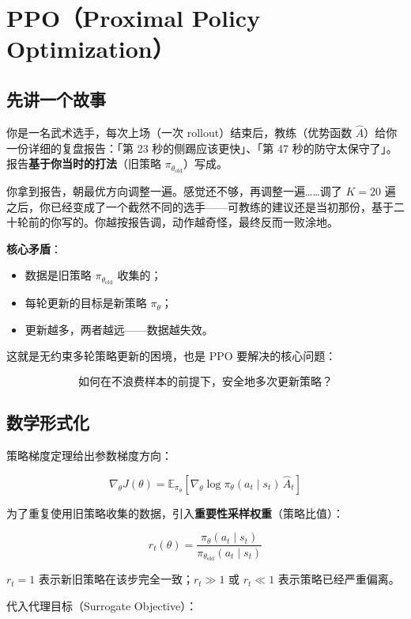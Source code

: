 \documentclass{article}
\begin{document}
\section*{PPO（Proximal Policy Optimization）}

\subsection*{先讲一个故事}

你是一名武术选手，每次上场（一次 rollout）结束后，教练（优势函数 $\hat{A}$）给你一份详细的复盘报告：「第 23 秒的侧踢应该更快」、「第 47 秒的防守太保守了」。报告\textbf{基于你当时的打法}（旧策略 $\pi_{\theta_{\text{old}}}$）写成。

你拿到报告，朝最优方向调整一遍。感觉还不够，再调整一遍……调了 $K=20$ 遍之后，你已经变成了一个截然不同的选手——可教练的建议还是当初那份，基于二十轮前的你写的。你越按报告调，动作越奇怪，最终反而一败涂地。

\textbf{核心矛盾}：
\begin{itemize}
  \item 数据是旧策略 $\pi_{\theta_\text{old}}$ 收集的；
  \item 每轮更新的目标是新策略 $\pi_\theta$；
  \item 更新越多，两者越远——数据越失效。
\end{itemize}

这就是无约束多轮策略更新的困境，也是 PPO 要解决的核心问题：

\[
\boxed{\text{如何在不浪费样本的前提下，安全地多次更新策略？}}
\]

\subsection*{数学形式化}

策略梯度定理给出参数梯度方向：

\[
\nabla_\theta J(\theta) = \mathbb{E}_{\pi_\theta}\!\left[\nabla_\theta \log \pi_\theta(a_t \mid s_t)\,\hat{A}_t\right]
\]

为了重复使用旧策略收集的数据，引入\textbf{重要性采样权重}（策略比值）：

\[
\boxed{r_t(\theta) = \frac{\pi_\theta(a_t \mid s_t)}{\pi_{\theta_\text{old}}(a_t \mid s_t)}}
\]

$r_t = 1$ 表示新旧策略在该步完全一致；$r_t \gg 1$ 或 $r_t \ll 1$ 表示策略已经严重偏离。

代入代理目标（Surrogate Objective）：
\end{document}
